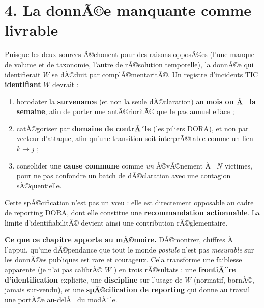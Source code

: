 ﻿\documentclass[11pt,a4paper]{article}
\begin{document}
\section*{4. La donnÃ©e manquante comme livrable}

Puisque les deux sources Ã©chouent pour des raisons opposÃ©es (l'une manque de volume et de
taxonomie, l'autre de rÃ©solution temporelle), la donnÃ©e qui identifierait $W$ se dÃ©duit par
complÃ©mentaritÃ©. Un registre d'incidents TIC \textbf{identifiant} $W$ devrait :
\begin{enumerate}\itemsep2pt
\item horodater la \textbf{survenance} (et non la seule dÃ©claration) au \textbf{mois ou Ã  la
      semaine}, afin de porter une antÃ©rioritÃ© que le pas annuel efface ;
\item catÃ©goriser par \textbf{domaine de contrÃ´le} (les piliers DORA), et non par vecteur
      d'attaque, afin qu'une transition soit interprÃ©table comme un lien $k \to j$ ;
\item consolider une \textbf{cause commune} comme \emph{un} Ã©vÃ©nement Ã  $N$ victimes, pour
      ne pas confondre un batch de dÃ©claration avec une contagion sÃ©quentielle.
\end{enumerate}
Cette spÃ©cification n'est pas un v\oe u : elle est directement opposable au cadre de
reporting DORA, dont elle constitue une \textbf{recommandation actionnable}. La limite
d'identifiabilitÃ© devient ainsi une contribution rÃ©glementaire.

\begin{cle}
\textbf{Ce que ce chapitre apporte au mÃ©moire.} DÃ©montrer, chiffres Ã  l'appui, qu'une
dÃ©pendance que tout le monde \emph{postule} n'est pas \emph{mesurable} sur les donnÃ©es
publiques est rare et courageux. Cela transforme une faiblesse apparente (\og je n'ai pas
calibrÃ© $W$ \fg) en trois rÃ©sultats : une \textbf{frontiÃ¨re d'identification} explicite, une
\textbf{discipline} sur l'usage de $W$ (normatif, bornÃ©, jamais sur-vendu), et une
\textbf{spÃ©cification de reporting} qui donne au travail une portÃ©e au-delÃ  du modÃ¨le.
\end{cle}
\end{document}
